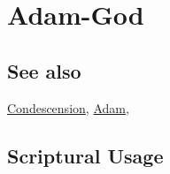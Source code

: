 \section{Adam-God}
	\label{ADAMGOD}
	
\subsection{See also}

	\hyperref[CONDESCENSION]{Condescension}, \hyperref[ADAM]{Adam},





\subsection{Scriptural Usage} %
	\label{ADAMGOD-SCRIPTURES}

	
	
